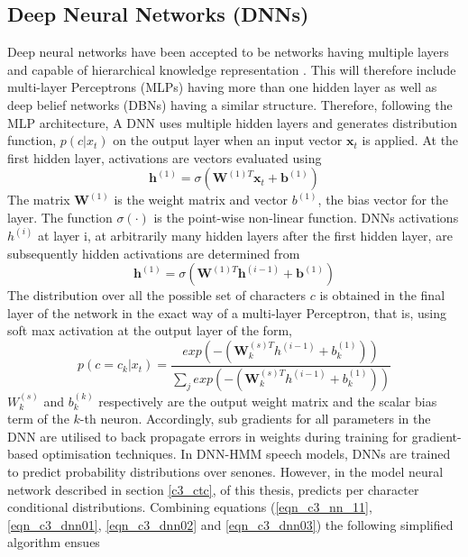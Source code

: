 \subsection{Deep Neural Networks (DNNs)}\label{dnn}

Deep neural networks have been accepted to be networks having multiple layers and capable of hierarchical knowledge representation \citep{yu2016automatic}.
 This will therefore include multi-layer Perceptrons (MLPs) having more than one hidden layer \citep{dahl2012context} as well as deep belief networks (DBNs)\citep{mohamed2009deep,yu2010roles} having a similar structure.  Therefore, following the MLP architecture, A DNN uses multiple hidden layers and generates distribution function, $p(c|x_t)$ on the output layer when an input vector $\mathbf{x}_t$ is applied.  At the first hidden layer, activations are vectors evaluated using
\begin{equation}\mathbf{h}^{(1)}=\sigma(\mathbf{W}^{(1)T}\mathbf{x}_t+\mathbf{b}^{(1)})
\label{eqn_c3_dnn01}\end{equation}
The matrix $\mathbf{W}^{(1)}$ is the weight matrix and vector $b^{(1)}$, the bias vector for the layer.  The function $\sigma(\cdot)$ is the point-wise non-linear function.
DNNs activations $h^{(i)}$ at layer i, at arbitrarily many hidden layers after the first hidden layer, are subsequently hidden activations are determined from
\begin{equation}\mathbf{h}^{(1)}=\sigma(\mathbf{W}^{(1)T}\mathbf{h}^{(i-1)}+\mathbf{b}^{(1)})
\label{eqn_c3_dnn02}\end{equation}
The distribution over all the possible set of characters $c$ is obtained in the final layer of the network in the exact way of a multi-layer Perceptron, that is, using soft max activation at the output layer of the form,
\begin{equation}p(c=c_k|x_t)=\frac{exp(-(\mathbf{W}^{(s)T}_kh^{(i-1)}+b_k^{(1)}))}{\sum_j exp(-(\mathbf{W}^{(s)T}_kh^{(i-1)}+b_k^{(1)}))}
\label{eqn_c3_dnn03}\end{equation}
$W_k^{(s)}$ and $b_k^{(k)}$ respectively are the output weight matrix and the scalar bias term of the $k$-th neuron. Accordingly, sub gradients for all parameters in the DNN are utilised to back propagate errors in weights during training for gradient-based optimisation techniques.  In DNN-HMM speech models,   DNNs are trained to predict probability distributions over senones.  However, in the model neural network described in section \ref{c3_ctc}, of this thesis, predicts per character conditional distributions.
Combining equations (\ref{eqn_c3_nn_11}, \ref{eqn_c3_dnn01}, \ref{eqn_c3_dnn02} and \ref{eqn_c3_dnn03}) the following simplified algorithm ensues


